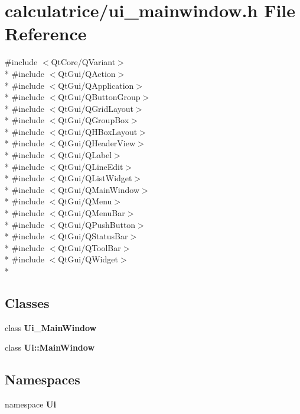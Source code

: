 \section{calculatrice/ui\-\_\-mainwindow.h File Reference}
\label{ui__mainwindow_8h}
{\ttfamily \#include $<$Qt\-Core/\-Q\-Variant$>$}\\*
{\ttfamily \#include $<$Qt\-Gui/\-Q\-Action$>$}\\*
{\ttfamily \#include $<$Qt\-Gui/\-Q\-Application$>$}\\*
{\ttfamily \#include $<$Qt\-Gui/\-Q\-Button\-Group$>$}\\*
{\ttfamily \#include $<$Qt\-Gui/\-Q\-Grid\-Layout$>$}\\*
{\ttfamily \#include $<$Qt\-Gui/\-Q\-Group\-Box$>$}\\*
{\ttfamily \#include $<$Qt\-Gui/\-Q\-H\-Box\-Layout$>$}\\*
{\ttfamily \#include $<$Qt\-Gui/\-Q\-Header\-View$>$}\\*
{\ttfamily \#include $<$Qt\-Gui/\-Q\-Label$>$}\\*
{\ttfamily \#include $<$Qt\-Gui/\-Q\-Line\-Edit$>$}\\*
{\ttfamily \#include $<$Qt\-Gui/\-Q\-List\-Widget$>$}\\*
{\ttfamily \#include $<$Qt\-Gui/\-Q\-Main\-Window$>$}\\*
{\ttfamily \#include $<$Qt\-Gui/\-Q\-Menu$>$}\\*
{\ttfamily \#include $<$Qt\-Gui/\-Q\-Menu\-Bar$>$}\\*
{\ttfamily \#include $<$Qt\-Gui/\-Q\-Push\-Button$>$}\\*
{\ttfamily \#include $<$Qt\-Gui/\-Q\-Status\-Bar$>$}\\*
{\ttfamily \#include $<$Qt\-Gui/\-Q\-Tool\-Bar$>$}\\*
{\ttfamily \#include $<$Qt\-Gui/\-Q\-Widget$>$}\\*
\subsection*{Classes}
\begin{DoxyCompactItemize}
\item 
class {\bf Ui\-\_\-\-Main\-Window}
\item 
class {\bf Ui\-::\-Main\-Window}
\end{DoxyCompactItemize}
\subsection*{Namespaces}
\begin{DoxyCompactItemize}
\item 
namespace {\bf Ui}
\end{DoxyCompactItemize}
